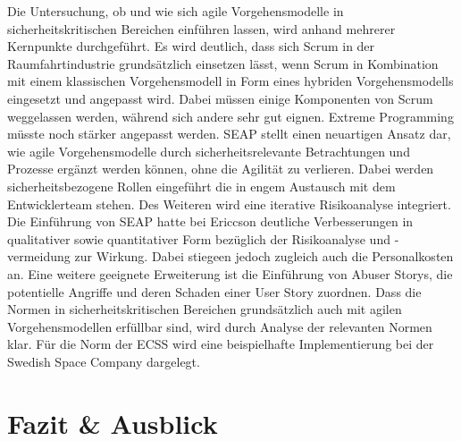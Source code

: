 Die Untersuchung, ob und wie sich agile Vorgehensmodelle in sicherheitskritischen Bereichen einführen lassen, wird anhand mehrerer Kernpunkte durchgeführt.
Es wird deutlich, dass sich Scrum in der Raumfahrtindustrie grundsätzlich einsetzen lässt, wenn Scrum in Kombination mit einem klassischen Vorgehensmodell in Form eines hybriden Vorgehensmodells eingesetzt und angepasst wird.
Dabei müssen einige Komponenten von Scrum weggelassen werden, während sich andere sehr gut eignen.
Extreme Programming müsste noch stärker angepasst werden.
SEAP stellt einen neuartigen Ansatz dar, wie agile Vorgehensmodelle durch sicherheitsrelevante Betrachtungen und Prozesse ergänzt werden können, ohne die Agilität zu verlieren.
Dabei werden sicherheitsbezogene Rollen eingeführt die in engem Austausch mit dem Entwicklerteam stehen.
Des Weiteren wird eine iterative Risikoanalyse integriert.
Die Einführung von SEAP hatte bei Ericcson deutliche Verbesserungen in qualitativer sowie quantitativer Form bezüglich der Risikoanalyse und -vermeidung zur Wirkung. 
Dabei stiegeen jedoch zugleich auch die Personalkosten an.
Eine weitere geeignete Erweiterung ist die Einführung von Abuser Storys, die potentielle Angriffe und deren Schaden einer User Story zuordnen.
Dass die Normen in sicherheitskritischen Bereichen grundsätzlich auch mit agilen Vorgehensmodellen erfüllbar sind, wird durch Analyse der relevanten Normen klar.
Für die Norm der ECSS wird eine beispielhafte Implementierung bei der Swedish Space Company dargelegt.

\section{Fazit \& Ausblick}

